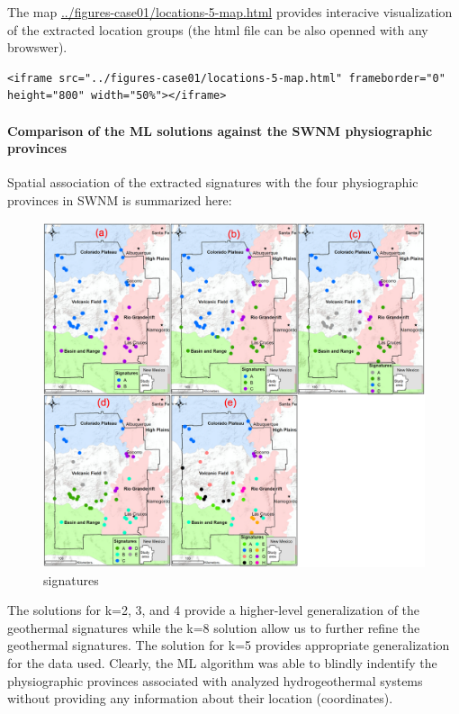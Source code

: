 \documentclass[11pt]{article}
\begin{document}
The map \url{../figures-case01/locations-5-map.html} provides interacive
visualization of the extracted location groups (the html file can be
also openned with any browswer).

\begin{verbatim}
<iframe src="../figures-case01/locations-5-map.html" frameborder="0" height="800" width="50%"></iframe>
\end{verbatim}

    \hypertarget{comparison-of-the-ml-solutions-against-the-swnm-physiographic-provinces}{%
\paragraph{Comparison of the ML solutions against the SWNM physiographic
provinces}\label{comparison-of-the-ml-solutions-against-the-swnm-physiographic-provinces}}

Spatial association of the extracted signatures with the four
physiographic provinces in SWNM is summarized here:

\begin{figure}
\centering
\includegraphics{../figures-case01/signatures.png}
\caption{signatures}
\end{figure}

The solutions for k=2, 3, and 4 provide a higher-level generalization of
the geothermal signatures while the k=8 solution allow us to further
refine the geothermal signatures. The solution for k=5 provides
appropriate generalization for the data used. Clearly, the ML algorithm
was able to blindly indentify the physiographic provinces associated
with analyzed hydrogeothermal systems without providing any information
about their location (coordinates).
\end{document}
